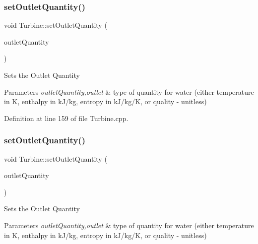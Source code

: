 \subsubsection{\texorpdfstring{set\+Outlet\+Quantity()}{setOutletQuantity()}\hspace{0.1cm}{\footnotesize\ttfamily [1/3]}}
{\footnotesize\ttfamily void Turbine\+::set\+Outlet\+Quantity (\begin{DoxyParamCaption}\item[{\hyperlink{class_steam_properties_ae0294bedf7d178c2d8fb6aed0f62fbff}{Steam\+Properties\+::\+Thermodynamic\+Quantity}}]{outlet\+Quantity }\end{DoxyParamCaption})}

Sets the Outlet Quantity


\begin{DoxyParams}{Parameters}
{\em outlet\+Quantity,outlet} & type of quantity for water (either temperature in K, enthalpy in k\+J/kg, entropy in k\+J/kg/K, or quality -\/ unitless) \\
\hline
\end{DoxyParams}


Definition at line 159 of file Turbine.\+cpp.

\mbox{\label{class_turbine_ad5ff4ba1657aac9519a6841336ec571c}} 
\subsubsection{\texorpdfstring{set\+Outlet\+Quantity()}{setOutletQuantity()}\hspace{0.1cm}{\footnotesize\ttfamily [2/3]}}
{\footnotesize\ttfamily void Turbine\+::set\+Outlet\+Quantity (\begin{DoxyParamCaption}\item[{\hyperlink{class_steam_properties_ae0294bedf7d178c2d8fb6aed0f62fbff}{Steam\+Properties\+::\+Thermodynamic\+Quantity}}]{outlet\+Quantity }\end{DoxyParamCaption})}

Sets the Outlet Quantity


\begin{DoxyParams}{Parameters}
{\em outlet\+Quantity,outlet} & type of quantity for water (either temperature in K, enthalpy in k\+J/kg, entropy in k\+J/kg/K, or quality -\/ unitless) \\
\hline
\end{DoxyParams}
\mbox{\label{class_turbine_ad5ff4ba1657aac9519a6841336ec571c}} 
